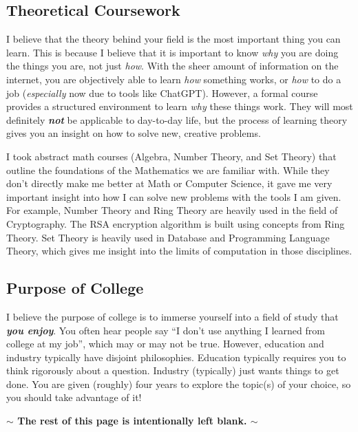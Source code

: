 \documentclass[12pt]{article}
\newenvironment{example}{
\begin{tcolorbox}[title=Example, colback=blue!5!white, colframe=black!75!blue]
}{ \end{tcolorbox} }
\renewcommand{\it}[1]{\textit{{#1}}}
\renewcommand{\bf}[1]{\textbf{{#1}}}
\newcommand{\ib}[1]{\textit{\textbf{{#1}}}}
\begin{document}
\subsection{Theoretical Coursework}
I believe that the theory behind your field is the most important thing you can
learn. This is because I believe that it is important to know \it{why} you are
doing the things you are, not just \it{how}. With the sheer amount of
information on the internet, you are objectively able to learn \it{how}
something works, or \it{how} to do a job (\it{especially} now due to tools like
ChatGPT). However, a formal course provides a structured environment to learn
\it{why} these things work. They will most definitely \ib{not} be applicable to
day-to-day life, but the process of learning theory gives you an insight on how
to solve new, creative problems.
\begin{example}
  I took abstract math courses (Algebra, Number Theory, and Set Theory) that
  outline the foundations of the Mathematics we are familiar with. While they
  don't directly make me better at Math or Computer Science, it gave me very
  important insight into how I can solve new problems with the tools I am
  given. For example, Number Theory and Ring Theory are heavily used in the
  field of Cryptography. The RSA encryption algorithm is built using concepts
  from Ring Theory. Set Theory is heavily used in Database and Programming
  Language Theory, which gives me insight into the limits of computation in
  those disciplines.
\end{example}

\subsection{Purpose of College}
I believe the purpose of college is to immerse yourself into a field of study
that \ib{you enjoy}. You often hear people say ``I don't use anything I learned
from college at my job'', which may or may not be true. However, education and
industry typically have disjoint philosophies. Education typically requires you
to think rigorously about a question. Industry (typically) just wants things to
get done. You are given (roughly) four years to explore the topic(s) of your
choice, so you should take advantage of it!
\begin{center}
  \vspace{5em}
  \bf{$\bm{\sim}$ The rest of this page is intentionally left blank. $\bm{\sim}$}
\end{center}
\end{document}
